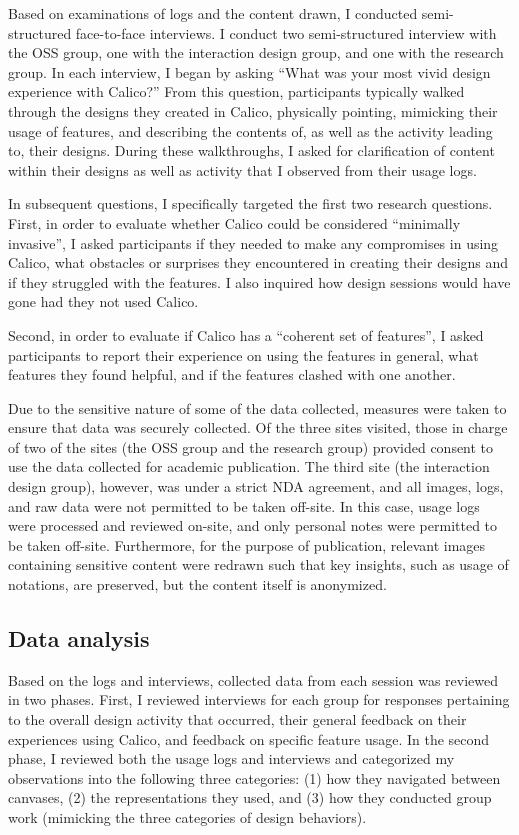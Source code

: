 \documentclass[12pt,fleqn]{ucithesis}
\begin{document}
Based on examinations of logs and the content drawn, I conducted semi-structured face-to-face interviews. I conduct two semi-structured interview with the OSS group, one with the interaction design group, and one with the research group. In each interview, I began by asking ``What was your most vivid design experience with Calico?'' From this question, participants typically walked through the designs they created in Calico, physically pointing, mimicking their usage of features, and describing the contents of, as well as the activity leading to, their designs. During these walkthroughs, I asked for clarification of content within their designs as well as activity that I observed from their usage logs.

In subsequent questions, I specifically targeted the first two research questions. First, in order to evaluate whether Calico could be considered ``minimally invasive'', I asked participants if they needed to make any compromises in using Calico, what obstacles or surprises they encountered in creating their designs and if they struggled with the features. I also inquired how design sessions would have gone had they not used Calico. 

Second, in order to evaluate if Calico has a ``coherent set of features'', I asked participants to report their experience on using the features in general, what features they found helpful, and if the features clashed with one another. 

Due to the sensitive nature of some of the data collected, measures were taken to ensure that data was securely collected. Of the three sites visited, those in charge of two of the sites (the OSS group and the research group) provided consent to use the data collected for academic publication. The third site (the interaction design group), however,  was under a strict NDA agreement, and all images, logs, and raw data were not permitted to be taken off-site. In this case, usage logs were processed and reviewed on-site, and only personal notes were permitted to be taken off-site. Furthermore, for the purpose of publication, relevant images containing sensitive content were redrawn such that key insights, such as usage of notations, are preserved, but the content itself is anonymized.

\subsection{Data analysis}

Based on the logs and interviews, collected data from each session was reviewed in two phases. First, I reviewed interviews for each group for responses pertaining to the overall design activity that occurred, their general feedback on their experiences using Calico, and feedback on specific feature usage. In the second phase, I reviewed both the usage logs and interviews and categorized my observations into the following three categories: (1) how they navigated between canvases, (2) the representations they used, and (3) how they conducted group work (mimicking the three categories of design behaviors). 
\end{document}
